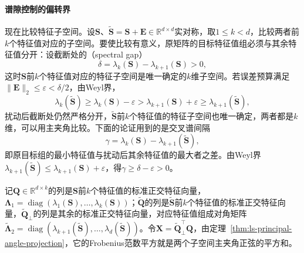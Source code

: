 \paragraph{谱隙控制的偏转界}

现在比较特征子空间。设$\bm S$、$\widetilde{\bm S}=\bm S+\bm E\in\mathbb R^{d\times d}$实对称，取$1\leq k<d$，比较两者前$k$个特征值对应的子空间。要使比较有意义，原矩阵的目标特征值组必须与其余特征值分开：设截断处的（spectral gap）
\[
 \delta=\lambda_k(\bm S)-\lambda_{k+1}(\bm S)>0 ,
\]
这时$\bm S$前$k$个特征值对应的特征子空间是唯一确定的$k$维子空间。若误差预算满足$\lVert\bm E\rVert_2\leq\varepsilon<\delta/2$，由Weyl界，
\[
 \lambda_k(\widetilde{\bm S})\geq\lambda_k(\bm S)-\varepsilon>\lambda_{k+1}(\bm S)+\varepsilon\geq\lambda_{k+1}(\widetilde{\bm S}),
\]
扰动后截断处仍然严格分开，$\widetilde{\bm S}$前$k$个特征值的特征子空间也唯一确定，两者都是$k$维，可以用主夹角比较。下面的论证用到的是交叉谱间隔
\[
 \gamma=\lambda_k(\bm S)-\lambda_{k+1}(\widetilde{\bm S}),
\]
即原目标组的最小特征值与扰动后其余特征值的最大者之差。由Weyl界$\lambda_{k+1}(\widetilde{\bm S})\leq\lambda_{k+1}(\bm S)+\varepsilon$，得$\gamma\geq\delta-\varepsilon>0$。

记$\bm Q\in\mathbb R^{d\times k}$的列是$\bm S$前$k$个特征值的标准正交特征向量，$\bm\Lambda_1=\operatorname{diag}(\lambda_1(\bm S),\ldots,\lambda_k(\bm S))$；$\widetilde{\bm Q}$的列是$\widetilde{\bm S}$前$k$个特征值的标准正交特征向量，$\widetilde{\bm Q}_\perp$的列是其余的标准正交特征向量，对应特征值组成对角矩阵$\widetilde{\bm\Lambda}_2=\operatorname{diag}(\lambda_{k+1}(\widetilde{\bm S}),\ldots,\lambda_d(\widetilde{\bm S}))$。令$\bm X=\widetilde{\bm Q}_\perp^\top\bm Q$，由定理~\ref{thm:ls-principal-angle-projection}，它的Frobenius范数平方就是两个子空间主夹角正弦的平方和。

